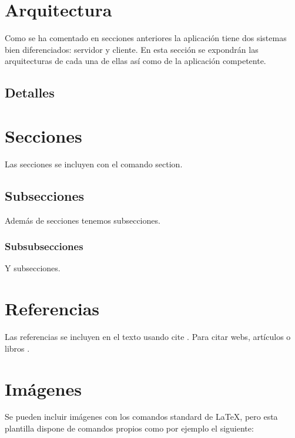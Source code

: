 \section{Arquitectura}\label{arquitectura}

Como se ha comentado en secciones anteriores la aplicación tiene dos sistemas bien diferenciados: servidor y cliente. En esta sección se expondrán las arquitecturas de cada una de ellas así como de la aplicación competente.




\subsection{Detalles}\label{detalles}



\section{Secciones}

Las secciones se incluyen con el comando section.

\subsection{Subsecciones}

Además de secciones tenemos subsecciones.

\subsubsection{Subsubsecciones}

Y subsecciones. 


\section{Referencias}

Las referencias se incluyen en el texto usando cite \cite{wiki:latex}. Para citar webs, artículos o libros \cite{koza92}.


\section{Imágenes}

Se pueden incluir imágenes con los comandos standard de \LaTeX, pero esta plantilla dispone de comandos propios como por ejemplo el siguiente:




